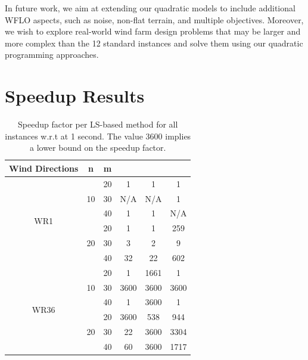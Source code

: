 \documentclass[preprint,12pt]{elsarticle}
\newcommand{\qcls}{{\sf {\small QC-LS\xspace}}}
\newcommand{\ilpls}{{\sf {\small ILP-LS\xspace}}}
\newcommand{\qulsgrb}{{\sf {\small QU-LS(GRB)\xspace}}}
\newcommand{\qulsda}{{\sf {\small QU-LS(DA)\xspace}}}
\begin{document}
In future work, we aim at extending our quadratic models to include additional 
WFLO aspects, such as noise, non-flat terrain, and multiple objectives. 
Moreover, we wish to explore real-world wind farm design problems 
that may be larger and more complex than the 12 standard instances 
and solve them 
using our quadratic programming approaches. 



\appendix

\section{Speedup Results}
\label{app1}



\begin{table}[t!]
	\small
	\begin{tabular}{| c | c | c | c | c | c | }
		\toprule
		Wind Directions  & n  & m  & \qcls &  \ilpls & \qulsgrb  \\
		\toprule
		\multirow{6}{*}{WR1}  & \multirow{3}{*}{10}  & 20 & 1       & 1 & 1  \\
		& & 30   & N/A & N/A & 1     \\
		& & 40 & 1 & 1 & N/A                \\
		\cline{2-6}
		&\multirow{3}{*}{20}   & 20  & 1  & 1  & 259         \\
		&&30   & 3 & 2  & 9    \\
		&&40   & 32 & 22  & 602        \\
		\hline
		\multirow{6}{*}{WR36} &  \multirow{3}{*}{10}    & 20 & 1       & 1661 & 1  \\
		&& 30  & 3600 & 3600 & 3600                     \\
		&&40   & 1 & 3600 & 1          \\
		\cline{2-6}
		&  \multirow{3}{*}{20}   & 20   & 3600  & 538 & 944            \\
		&&30   & 22 & 3600 & 3304                     \\
		&&40   & 60 & 3600 & 1717 \\
		\bottomrule                   
	\end{tabular}
	
	\vspace{0.5em}
	\caption{Speedup factor per LS-based method for all instances w.r.t \qulsda{} at 1 second. The value 3600 implies a lower bound on the speedup factor.}\label{tab:results3}
\end{table}
\end{document}
